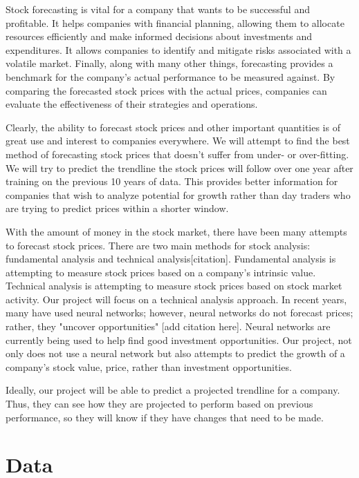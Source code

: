 \documentclass[11pt]{article}
\begin{document}
Stock forecasting is vital for a company that wants to be successful and profitable. It helps companies 
with financial planning, allowing them to allocate resources efficiently and make informed decisions 
about investments and expenditures. It allows companies to identify and mitigate risks associated with 
a volatile market. Finally, along with many other things, forecasting provides a benchmark for the 
company's actual performance to be measured against. By comparing the forecasted stock prices with the 
actual prices, companies can evaluate the effectiveness of their strategies and operations.\par
Clearly, the ability to forecast stock prices and other important quantities is of great use and interest 
to companies everywhere. We will attempt to find the best method of forecasting stock prices that doesn't 
suffer from under- or over-fitting. We will try to predict the trendline the stock prices will follow over 
one year after training on the previous 10 years of data. This provides better information for companies 
that wish to analyze potential for growth rather than day traders who are trying to predict prices within 
a shorter window.\par
With the amount of money in the stock market, there have been many attempts to forecast stock prices. There 
are two main methods for stock analysis: fundamental analysis and technical analysis[citation]. Fundamental 
analysis is attempting to measure stock prices based on a company's intrinsic value. Technical analysis is 
attempting to measure stock prices based on stock market activity. Our project will focus on a technical 
analysis approach. In recent years, many have used neural networks; however, neural networks do not forecast 
prices; rather, they "uncover opportunities" [add citation here]. Neural networks are currently being used to 
help find good investment opportunities. Our project, not only does not use a neural network but also attempts 
to predict the growth of a company's stock value, price, rather than investment opportunities.\par
Ideally, our project will be able to predict a projected trendline for a company. Thus, they can see how they are 
projected to perform based on previous performance, so they will know if they have changes that need to be made.


\section{Data}
\end{document}
